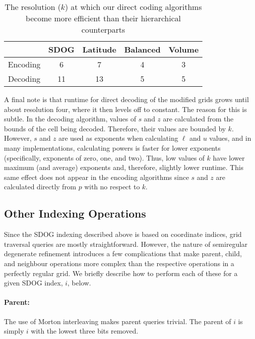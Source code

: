 \begin{table}[htp!]
	\centering
	\caption[Resolution at which direct coding becomes more efficient than hierarchical]{
		The resolution ($k$) at which our direct coding algorithms become more efficient than their hierarchical counterparts
	}
	\begin{tabular}{@{} c c c c c @{}}
		\toprule
		         & SDOG & Latitude & Balanced & Volume \\ \midrule
		Encoding & 6    & 7        & 4        & 3      \\
		Decoding & 11   & 13       & 5        & 5      \\ \bottomrule
	\end{tabular}
	\label{tab:hierarch-vs-direct}
\end{table}


A final note is that runtime for direct decoding of the modified grids grows until about resolution four, where it then levels off to constant.
The reason for this is subtle.
In the decoding algorithm, values of $s$ and $z$ are calculated from the bounds of the cell being decoded.
Therefore, their values are bounded by $k$.
However, $s$ and $z$ are used as exponents when calculating $\ell$ and $u$ values, and in many implementations, calculating powers is faster for lower exponents (specifically, exponents of zero, one, and two).
Thus, low values of $k$ have lower maximum (and average) exponents and, therefore, slightly lower runtime.
This same effect does not appear in the encoding algorithms since $s$ and $z$ are calculated directly from $p$ with no respect to $k$.


\subsection{Other Indexing Operations}
Since the SDOG indexing described above is based on coordinate indices, grid traversal queries are mostly straightforward.
However, the nature of semiregular degenerate refinement introduces a few complications that make parent, child, and neighbour operations more complex than the respective operations in a perfectly regular grid.
We briefly describe how to perform each of these for a given SDOG index, $i$, below.


\paragraph{Parent:}
The use of Morton interleaving makes parent queries trivial. The parent of $i$ is simply $i$ with the lowest three bits removed.



